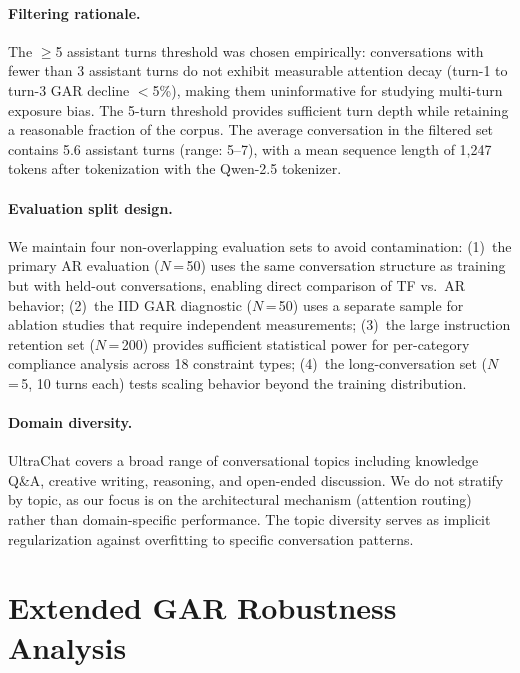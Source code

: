 \paragraph{Filtering rationale.} The $\geq$5 assistant turns threshold was chosen empirically: conversations with fewer than 3 assistant turns do not exhibit measurable attention decay (turn-1 to turn-3 GAR decline $<$5\%), making them uninformative for studying multi-turn exposure bias. The 5-turn threshold provides sufficient turn depth while retaining a reasonable fraction of the corpus. The average conversation in the filtered set contains 5.6 assistant turns (range: 5--7), with a mean sequence length of 1,247 tokens after tokenization with the Qwen-2.5 tokenizer.

\paragraph{Evaluation split design.} We maintain four non-overlapping evaluation sets to avoid contamination: (1)~the primary AR evaluation ($N$\,=\,50) uses the same conversation structure as training but with held-out conversations, enabling direct comparison of TF vs.\ AR behavior; (2)~the IID GAR diagnostic ($N$\,=\,50) uses a separate sample for ablation studies that require independent measurements; (3)~the large instruction retention set ($N$\,=\,200) provides sufficient statistical power for per-category compliance analysis across 18 constraint types; (4)~the long-conversation set ($N$\,=\,5, 10 turns each) tests scaling behavior beyond the training distribution.

\paragraph{Domain diversity.} UltraChat covers a broad range of conversational topics including knowledge Q\&A, creative writing, reasoning, and open-ended discussion. We do not stratify by topic, as our focus is on the architectural mechanism (attention routing) rather than domain-specific performance. The topic diversity serves as implicit regularization against overfitting to specific conversation patterns.



\section{Extended GAR Robustness Analysis}\label{sec:appendix-gar-ext}


